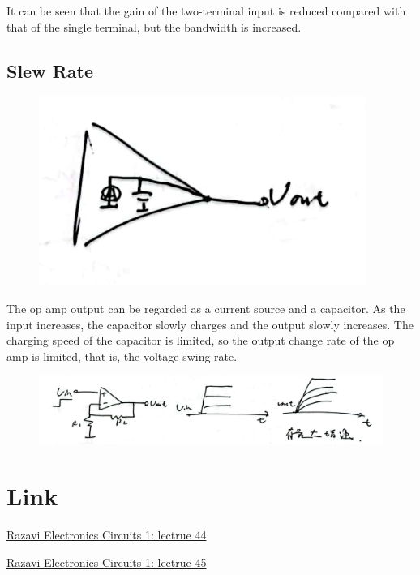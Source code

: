 \documentclass[fontset=windows]{article}
\begin{document}
It can be seen that the gain of the two-terminal input is reduced compared with that of the single terminal, but the bandwidth is increased. 

\subsection*{Slew Rate}

\begin{figure}[htbp]
    \centering
    \includegraphics[scale=0.4]{20.jpg}
    \captionsetup{labelformat=empty}
    \caption{}
    \label{20}
\end{figure}

The op amp output can be regarded as a current source and a capacitor. As the input increases, the capacitor slowly charges and the output slowly increases. The charging speed of the capacitor is limited, so the output change rate of the op amp is limited, that is, the voltage swing rate. 

\begin{figure}[htbp]
    \centering
    \includegraphics[scale=0.6]{19.jpg}
    \captionsetup{labelformat=empty}
    \caption{}
    \label{19}
\end{figure}

\section*{Link}

\href{https://www.bilibili.com/video/BV1FD4y1R7Ah?p=44&vd_source=1d0c07486a3bd3b0adb8ac548bf6453e}{Razavi Electronics Circuits 1: lectrue 44}

\href{https://www.bilibili.com/video/BV1FD4y1R7Ah?p=45&vd_source=1d0c07486a3bd3b0adb8ac548bf6453e}{Razavi Electronics Circuits 1: lectrue 45}
\end{document}
